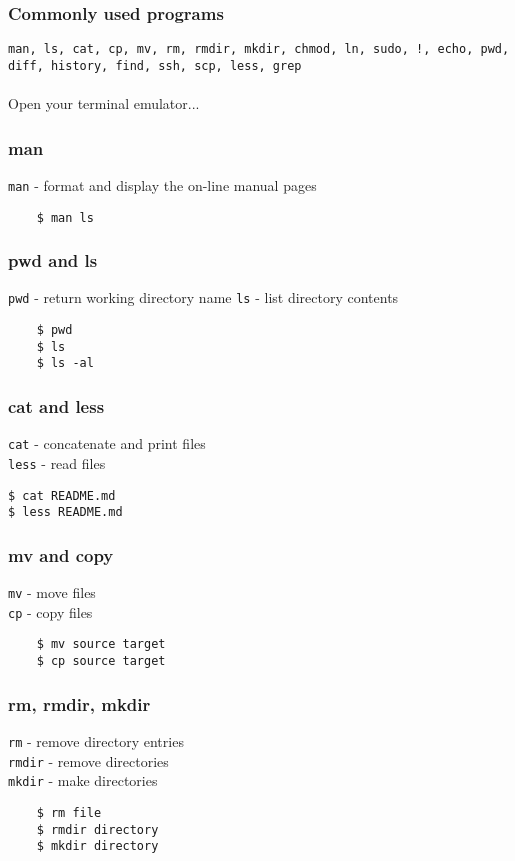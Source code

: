 \documentclass{beamer}
\begin{document}
\begin{frame}
\frametitle{Commonly used programs}
\texttt{man, ls, cat, cp, mv, rm, rmdir, mkdir, chmod, ln, sudo, !, echo, pwd, diff, history, find, ssh, scp, less, grep}
\\~\\
Open your terminal emulator...
\end{frame}


\begin{frame}[fragile]
\frametitle{man}
	\texttt{man} - format and display the on-line manual pages
	\begin{verbatim}
	$ man ls
	\end{verbatim}
\end{frame}


\begin{frame}[fragile]
\frametitle{pwd and ls}
	\texttt{pwd} - return working directory name
	\texttt{ls} - list directory contents	
	\begin{verbatim}
	$ pwd
	$ ls
	$ ls -al
	\end{verbatim}
\end{frame}


\begin{frame}[fragile]
\frametitle{cat and less}
	\texttt{cat} - concatenate and print files
	\\
	\texttt{less} - read files
	\begin{verbatim}
$ cat README.md
$ less README.md
	\end{verbatim}
\end{frame}


\begin{frame}[fragile]
\frametitle{mv and copy}
	\texttt{mv} - move files
	\\
	\texttt{cp} - copy files
	\begin{verbatim}
	$ mv source target
	$ cp source target
	\end{verbatim}
\end{frame}


\begin{frame}[fragile]
\frametitle{rm, rmdir, mkdir}
	\texttt{rm} - remove directory entries
	\\
	\texttt{rmdir} - remove directories
	\\
	\texttt{mkdir} - make directories
	\begin{verbatim}
	$ rm file
	$ rmdir directory
	$ mkdir directory
	\end{verbatim}
\end{frame}
\end{document}
